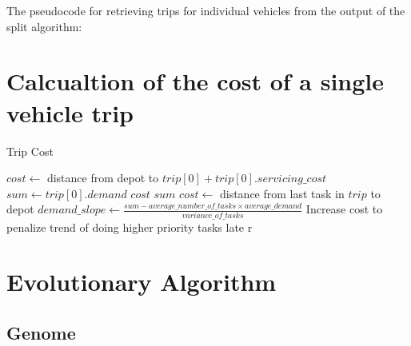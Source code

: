 
The pseudocode for retrieving trips for individual vehicles from the output of the split algorithm:



\section{Calcualtion of the cost of a single vehicle trip} %
\label{sec:calcualtion_of_the_cost_of_a_single_vehicle_trip}

\begin{algorithm}[thbp]
\caption{Trip Cost}\label{trip-cost-pseudocode}
\begin{algorithmic}[1]

	\State $cost \leftarrow$ distance from depot to $trip[0] + trip[0].servicing\_cost$
	\State $sum \leftarrow trip[0].demand$
		\State $cost$
		\State $sum$
	\EndFor
	\State $cost \leftarrow$ distance from last task in $trip$ to depot
	\State $demand\_slope \leftarrow \frac{sum - average\_number\_of\_tasks \times average\_demand}{variance\_of\_tasks}$
		\State Increase cost to penalize trend of doing higher priority tasks late
r	\EndIf
\EndProcedure

\end{algorithmic}
\end{algorithm}



\section{Evolutionary Algorithm} %
\label{sec:evolutionary_algorithm}

\subsection{Genome} %
\label{sub:genome}




